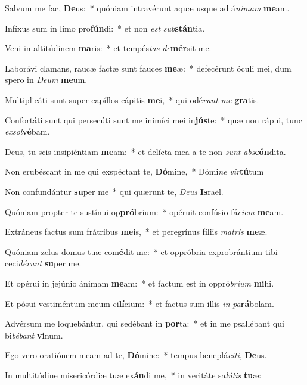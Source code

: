 \item Salvum me fac, \textbf{De}us:~* quóniam intravérunt aquæ usque ad á\textit{ni}\textit{mam} \textbf{me}am.
\item Infíxus sum in limo pro\textbf{fún}di:~* et non \textit{est} \textit{sub}\textbf{stán}tia.
\item Veni in altitúdinem \textbf{ma}ris:~* et tempés\textit{tas} \textit{de}\textbf{mér}sit me.
\item Laborávi clamans, raucæ factæ sunt fauces \textbf{me}æ:~* defecérunt óculi mei, dum spero in \textit{De}\textit{um} \textbf{me}um.
\item Multiplicáti sunt super capíllos cápitis \textbf{me}i,~* qui odé\textit{runt} \textit{me} \textbf{gra}tis.
\item Confortáti sunt qui persecúti sunt me inimíci mei in\textbf{jús}te:~* quæ non rápui, tunc \textit{ex}\textit{sol}\textbf{vé}bam.
\item Deus, tu scis insipiéntiam \textbf{me}am:~* et delícta mea a te non \textit{sunt} \textit{abs}\textbf{cón}dita.
\item Non erubéscant in me qui exspéctant te, \textbf{Dó}mine,~* Dómi\textit{ne} \textit{vir}\textbf{tú}tum
\item Non confundántur \textbf{su}per me~* qui quærunt te, \textit{De}\textit{us} \textbf{Is}raël.
\item Quóniam propter te sustínui op\textbf{pró}brium:~* opéruit confúsio fá\textit{ci}\textit{em} \textbf{me}am.
\item Extráneus factus sum frátribus \textbf{me}is,~* et peregrínus fíliis \textit{ma}\textit{tris} \textbf{me}æ.
\item Quóniam zelus domus tuæ com\textbf{é}dit me:~* et oppróbria exprobrántium tibi ceci\textit{dé}\textit{runt} \textbf{su}per me.
\item Et opérui in jejúnio ánimam \textbf{me}am:~* et factum est in oppró\textit{bri}\textit{um} \textbf{mi}hi.
\item Et pósui vestiméntum meum ci\textbf{lí}cium:~* et factus sum illis \textit{in} \textit{pa}\textbf{rá}bolam.
\item Advérsum me loquebántur, qui sedébant in \textbf{por}ta:~* et in me psallébant qui bi\textit{bé}\textit{bant} \textbf{vi}num.
\item Ego vero oratiónem meam ad te, \textbf{Dó}mine:~* tempus beneplá\textit{ci}\textit{ti}, \textbf{De}us.
\item In multitúdine misericórdiæ tuæ ex\textbf{áu}di me,~* in veritáte sa\textit{lú}\textit{tis} \textbf{tu}æ:
